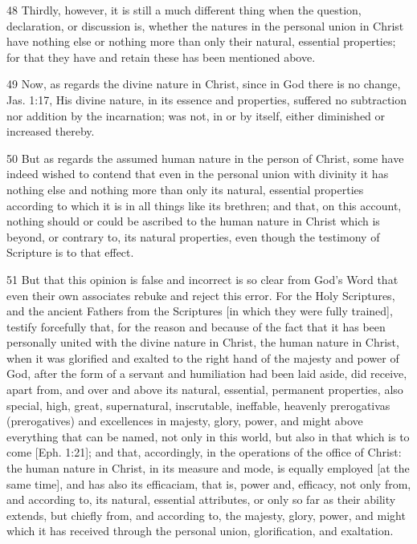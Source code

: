 {48 Thirdly, however, it is still a much different thing when the question, declaration, or discussion is, whether the natures in the personal union in Christ have nothing else or nothing more than only their natural, essential properties; for that they have and retain these has been mentioned above.

49 Now, as regards the divine nature in Christ, since in God there is no change, Jas. 1:17, His divine nature, in its essence and properties, suffered no subtraction nor addition by the incarnation; was not, in or by itself, either diminished or increased thereby.

50 But as regards the assumed human nature in the person of Christ, some have indeed wished to contend that even in the personal union with divinity it has nothing else and nothing more than only its natural, essential properties according to which it is in all things like its brethren; and that, on this account, nothing should or could be ascribed to the human nature in Christ which is beyond, or contrary to, its natural properties, even though the testimony of Scripture is to that effect.

51 But that this opinion is false and incorrect is so clear from God’s Word that even their own associates rebuke and reject this error. For the Holy Scriptures, and the ancient Fathers from the Scriptures [in which they were fully trained], testify forcefully that, for the reason and because of the fact that it has been personally united with the divine nature in Christ, the human nature in Christ, when it was glorified and exalted to the right hand of the majesty and power of God, after the form of a servant and humiliation had been laid aside, did receive, apart from, and over and above its natural, essential, permanent properties, also special, high, great, supernatural, inscrutable, ineffable, heavenly prerogativas (prerogatives) and excellences in majesty, glory, power, and might above everything that can be named, not only in this world, but also in that which is to come [Eph. 1:21]; and that, accordingly, in the operations of the office of Christ: the human nature in Christ, in its measure and mode, is equally employed [at the same time], and has also its efficaciam, that is, power and, efficacy, not only from, and according to, its natural, essential attributes, or only so far as their ability extends, but chiefly from, and according to, the majesty, glory, power, and might which it has received through the personal union, glorification, and exaltation.

}

